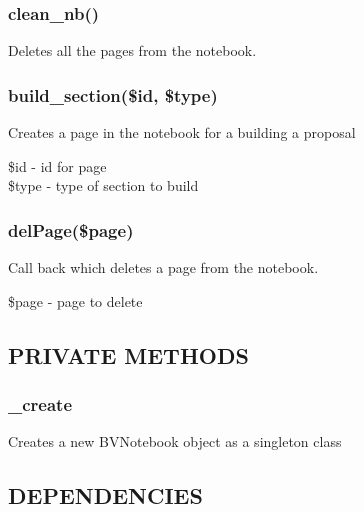 \documentclass{article}
\begin{document}
\subsubsection*{clean\_nb()\label{BVNotebook_clean_nb_}}


Deletes all the pages from the notebook.

\subsubsection*{build\_section(\$id, \$type)\label{BVNotebook_build_section_id_type_}}


Creates a page in the notebook for a building a proposal

\begin{description}

\item[{\$id - id for page}] \mbox{}
\item[{\$type - type of section to build}] \mbox{}\end{description}
\subsubsection*{delPage(\$page)\label{BVNotebook_delPage_page_}}


Call back which deletes a page from the notebook.

\begin{description}

\item[{\$page - page to delete}] \mbox{}\end{description}
\subsection*{PRIVATE METHODS\label{BVNotebook_PRIVATE_METHODS}}
\subsubsection*{\_create\label{BVNotebook__create}}


Creates a new BVNotebook object as a singleton class

\subsection*{DEPENDENCIES\label{BVNotebook_DEPENDENCIES}}
\end{document}
